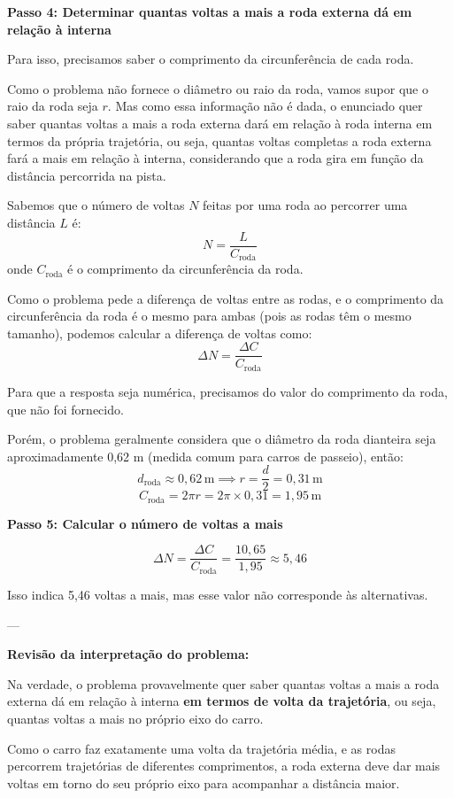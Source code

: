 \documentclass[a4paper,12pt]{article}
\begin{document}
\begin{flushleft}
\textbf{Passo 4: Determinar quantas voltas a mais a roda externa dá em relação à interna}

Para isso, precisamos saber o comprimento da circunferência de cada roda.

Como o problema não fornece o diâmetro ou raio da roda, vamos supor que o raio da roda seja $r$. Mas como essa informação não é dada, o enunciado quer saber quantas voltas a mais a roda externa dará em relação à roda interna em termos da própria trajetória, ou seja, quantas voltas completas a roda externa fará a mais em relação à interna, considerando que a roda gira em função da distância percorrida na pista.

Sabemos que o número de voltas $N$ feitas por uma roda ao percorrer uma distância $L$ é:
\[
N = \frac{L}{C_{\text{roda}}}
\]
onde $C_{\text{roda}}$ é o comprimento da circunferência da roda.

Como o problema pede a diferença de voltas entre as rodas, e o comprimento da circunferência da roda é o mesmo para ambas (pois as rodas têm o mesmo tamanho), podemos calcular a diferença de voltas como:
\[
\Delta N = \frac{\Delta C}{C_{\text{roda}}}
\]

Para que a resposta seja numérica, precisamos do valor do comprimento da roda, que não foi fornecido.

Porém, o problema geralmente considera que o diâmetro da roda dianteira seja aproximadamente 0,62 m (medida comum para carros de passeio), então:
\[
d_{\text{roda}} \approx 0,62\,\text{m} \implies r = \frac{d}{2} = 0,31\,\text{m}
\]
\[
C_{\text{roda}} = 2 \pi r = 2 \pi \times 0,31 = 1,95\,\text{m}
\]

\bigskip

\textbf{Passo 5: Calcular o número de voltas a mais}

\[
\Delta N = \frac{\Delta C}{C_{\text{roda}}} = \frac{10,65}{1,95} \approx 5,46
\]

Isso indica 5,46 voltas a mais, mas esse valor não corresponde às alternativas.

---

\textbf{Revisão da interpretação do problema:}

Na verdade, o problema provavelmente quer saber quantas voltas a mais a roda externa dá em relação à interna \textbf{em termos de volta da trajetória}, ou seja, quantas voltas a mais no próprio eixo do carro.

Como o carro faz exatamente uma volta da trajetória média, e as rodas percorrem trajetórias de diferentes comprimentos, a roda externa deve dar mais voltas em torno do seu próprio eixo para acompanhar a distância maior.


\end{flushleft}
\end{document}

